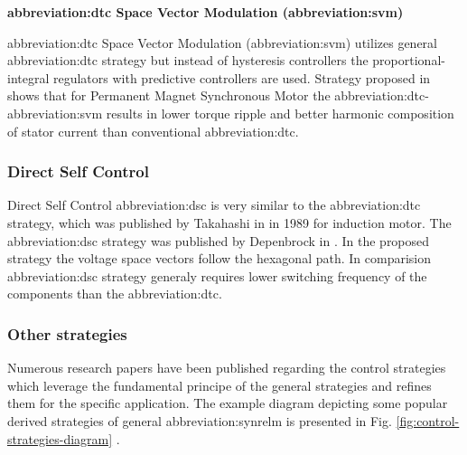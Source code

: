 \documentclass[a4paper, twoside, 11pt]{article}
\begin{document}
            \vspace*{0.85cm}
             \hspace*{-\parindent} \textbf{\gls{abbreviation:dtc} Space Vector Modulation (\gls{abbreviation:svm})}\par
            \hspace*{\parindent} \gls{abbreviation:dtc} Space Vector Modulation (\gls{abbreviation:svm}) utilizes general \gls{abbreviation:dtc} strategy but instead of hysteresis controllers the proportional-integral regulators with predictive controllers are used. Strategy proposed in \cite{swierczynski-dsp-based-direct-torque-control-of-permanent-magnet-synchronous-motor-using-space-vector-modulation-dtcsvm} shows that for Permanent Magnet Synchronous Motor the \gls{abbreviation:dtc}-\gls{abbreviation:svm} results in lower torque ripple and better harmonic composition of stator current than conventional \gls{abbreviation:dtc}.

        
        \newpage
        \subsubsection{Direct Self Control}
            Direct Self Control \gls{abbreviation:dsc} is very similar to the \gls{abbreviation:dtc} strategy, which was published by Takahashi in \cite{takahashi-high-performance-direct-torque-control-of-an-iduction-motor} in 1989 for induction motor. The \gls{abbreviation:dsc} strategy was published by Depenbrock in \cite{depenbrock-direct-self-control-of-inverter-fed-induction-machine}. In the proposed strategy the voltage space vectors follow the hexagonal path. In comparision \gls{abbreviation:dsc} strategy generaly requires lower switching frequency of the components than the \gls{abbreviation:dtc}.

        \subsubsection{Other strategies}
            Numerous research papers have been published regarding the control strategies which leverage the fundamental principe of the general strategies and refines them for the specific application. The example diagram depicting some popular derived strategies of general \gls{abbreviation:synrelm} is presented in Fig. \ref{fig:control-strategies-diagram} \cite{heidari-a-review-of-synchronour-relucatence-motor-drive-advancements}.
\end{document}
